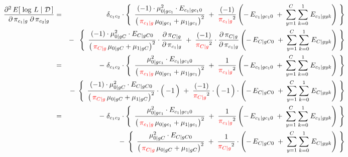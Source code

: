 \begin{eqnarray*}
\dfrac{\partial^{2}\,E\!\left[\,\left.\log\,L\;\right\vert\,\mathcal{D}\,\right]}{\partial\,\pi_{c_{1} \vert g}\;\partial\,\pi_{c_{2} \vert g}}
&=&
	{\color{white}-} \;\;
	\delta_{c_{1}c_{2}}
	\cdot
	\left\{\;\,
		\dfrac{
			(-1) \cdot \mu_{0 \vert gc_{1}}^{2} \cdot E_{c_{1} \vert gc_{1}0}
			}{
			\left(\,{\color{red}\pi_{c_{1} \vert g}}\,\mu_{0 \vert gc_{1}} + \mu_{1\vert gc_{1}}\right)^{2}
			}
		\;+\;
		\dfrac{(-1)}{{\color{red}\pi_{c_{1} \vert g}}^{2}}
		\left(
			-\,E_{c_{1} \vert gc_{1}0}
			\;+\;
			\overset{C}{\underset{y=1}{\sum}} \; \overset{1}{\underset{k=0}{\sum}} \; E_{c_{1} \vert gyk}
		\right)
	\;\right\}
\\
&&
	- \;\;
	\left\{\;\,
		\dfrac{
			(-1) \cdot \mu_{0 \vert gC}^{2} \cdot E_{C \vert gC0}
			}{
			\left(\,{\color{red}\pi_{C \vert g}}\,\mu_{0 \vert gC}+\mu_{1\vert gC}\right)^{2}
			}
		\cdot
		\dfrac{\partial\,\pi_{C \vert g}}{\partial\,\pi_{c_{1} \vert g}}
		\;+\;
		\dfrac{(-1)}{{\color{red}\pi_{C \vert g}}^{2}}
		\cdot
		\dfrac{\partial\,\pi_{C \vert g}}{\partial\,\pi_{c_{1} \vert g}}
		\left(
			-\,E_{C \vert gC0}
			\;+\;
			\overset{C}{\underset{y=1}{\sum}} \; \overset{1}{\underset{k=0}{\sum}} \; E_{C \vert gyk}
		\right)
	\;\right\}
\\
&=&
	- \; \delta_{c_{1}c_{2}}
	\cdot
	\left\{\;\,
		\dfrac{
			\mu_{0 \vert gc_{1}}^{2} \cdot E_{c_{1} \vert gc_{1}0}
			}{
			\left(\,{\color{red}\pi_{c_{1} \vert g}}\,\mu_{0 \vert gc_{1}} + \mu_{1\vert gc_{1}}\right)^{2}
			}
		\;+\;
		\dfrac{1}{{\color{red}\pi_{c_{1} \vert g}}^{2}}
		\left(
			-\,E_{c_{1} \vert gc_{1}0}
			\;+\;
			\overset{C}{\underset{y=1}{\sum}} \; \overset{1}{\underset{k=0}{\sum}} \; E_{c_{1} \vert gyk}
		\right)
	\;\right\}
\\
&&
	- \;
	\left\{\;\,
		\dfrac{
			(-1) \cdot \mu_{0 \vert gC}^{2} \cdot E_{C \vert gC0}
			}{
			\left(\,{\color{red}\pi_{C \vert g}}\,\mu_{0 \vert gC}+\mu_{1\vert gC}\right)^{2}
			}
		\cdot
		\left(\,\overset{{\color{white}.}}{-1}\,\right)
		\;+\;
		\dfrac{(-1)}{{\color{red}\pi_{C \vert g}}^{2}}
		\cdot
		\left(\,\overset{{\color{white}.}}{-1}\,\right)
		\cdot
		\left(
			-\,E_{C \vert gC0}
			\;+\;
			\overset{C}{\underset{y=1}{\sum}} \; \overset{1}{\underset{k=0}{\sum}} \; E_{C \vert gyk}
		\right)
	\;\right\}
\\
&=&
	- \; \delta_{c_{1}c_{2}}
	\cdot
	\left\{\;\,
		\dfrac{
			\mu_{0 \vert gc_{1}}^{2} \cdot E_{c_{1} \vert gc_{1}0}
			}{
			\left(\,{\color{red}\pi_{c_{1} \vert g}}\,\mu_{0 \vert gc_{1}} + \mu_{1\vert gc_{1}}\right)^{2}
			}
		\;+\;
		\dfrac{1}{{\color{red}\pi_{c_{1} \vert g}}^{2}}
		\left(
			-\,E_{c_{1} \vert gc_{1}0}
			\;+\;
			\overset{C}{\underset{y=1}{\sum}} \; \overset{1}{\underset{k=0}{\sum}} \; E_{c_{1} \vert gyk}
		\right)
	\;\right\}
\\
&&
	- \;
	\left\{\;\,
		\dfrac{
			\mu_{0 \vert gC}^{2} \cdot E_{C \vert gC0}
			}{
			\left(\,{\color{red}\pi_{C \vert g}}\,\mu_{0 \vert gC}+\mu_{1\vert gC}\right)^{2}
			}
		\;+\;
		\dfrac{1}{{\color{red}\pi_{C \vert g}}^{2}}
		\cdot
		\left(
			-\,E_{C \vert gC0}
			\;+\;
			\overset{C}{\underset{y=1}{\sum}} \; \overset{1}{\underset{k=0}{\sum}} \; E_{C \vert gyk}
		\right)
	\;\right\}
\end{eqnarray*}

